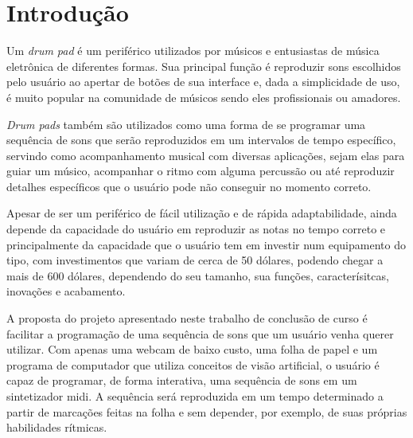 \documentclass[12pt]{report}
\begin{document}
\listoffigures

\newpage


\tableofcontents




\newpage



\chapter{Introdução}
\label{cha:introducao}

Um {\it drum pad} é um periférico utilizados por músicos e entusiastas
de música eletrônica de diferentes formas. Sua principal função é
reproduzir sons escolhidos pelo usuário ao apertar de botões de sua
interface e, dada a simplicidade de uso, é muito popular na comunidade
de músicos sendo eles profissionais ou amadores.

{\it Drum pads} também são utilizados como uma forma de se programar
uma sequência de sons que serão reproduzidos em um intervalos de tempo
específico, servindo como acompanhamento musical com diversas
aplicações, sejam elas para guiar um músico, acompanhar o ritmo com
alguma percussão ou até reproduzir detalhes específicos que o usuário
pode não conseguir no momento correto.

Apesar de ser um periférico de fácil utilização e de rápida
adaptabilidade, ainda depende da capacidade do usuário em reproduzir
as notas no tempo correto e principalmente da capacidade que o usuário
tem em investir num equipamento do tipo, com investimentos que variam
de cerca de 50 dólares, podendo chegar a mais de 600 dólares,
dependendo do seu tamanho, sua funções, caracterísitcas, inovações e
acabamento.

A proposta do projeto apresentado neste trabalho de conclusão de curso
é facilitar a programação de uma sequência de sons que um usuário
venha querer utilizar. Com apenas uma webcam de baixo custo, uma folha
de papel e um programa de computador que utiliza conceitos de visão
artificial, o usuário é capaz de programar, de forma interativa, uma
sequência de sons em um sintetizador midi. A sequência será
reproduzida em um tempo determinado a partir de marcações feitas na
folha e sem depender, por exemplo, de suas próprias habilidades
rítmicas.
\end{document}
